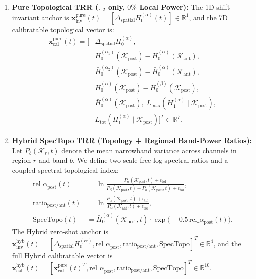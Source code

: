 \documentclass[10pt,twocolumn]{article}
\begin{document}
\begin{enumerate}
    \item \textbf{Pure Topological TRR ($\mathbb{F}_2$ only, $0\%$ Local Power):} The 1D shift-invariant anchor is $\mathbf{x}_{\mathrm{inv}}^{\mathrm{pure}}(t) = [\Delta_{\mathrm{spatial}} H_0^{(\alpha)}(t)] \in \mathbb{R}^1$, and the 7D calibratable topological vector is:
    \begin{equation}
    \begin{aligned}
        \mathbf{x}_{\mathrm{cal}}^{\mathrm{pure}}(t) = \Big[
        &\Delta_{\mathrm{spatial}} H_0^{(\alpha)},\\
        &\bar{H}_0^{(\alpha_1)}(\mathcal{K}_{\mathrm{post}}) - \bar{H}_0^{(\alpha)}(\mathcal{K}_{\mathrm{ant}}),\\
        &\bar{H}_0^{(\alpha_2)}(\mathcal{K}_{\mathrm{post}}) - \bar{H}_0^{(\alpha)}(\mathcal{K}_{\mathrm{ant}}),\\
        &\bar{H}_0^{(\alpha)}(\mathcal{K}_{\mathrm{post}}) - \bar{H}_0^{(\beta)}(\mathcal{K}_{\mathrm{post}}),\\
        &\bar{H}_0^{(\alpha)}(\mathcal{K}_{\mathrm{post}}),\;
        L_{\max}(H_1^{(\alpha)} \mid \mathcal{K}_{\mathrm{post}}),\\
        &L_{\mathrm{tot}}(H_1^{(\alpha)} \mid \mathcal{K}_{\mathrm{post}})
        \Big]^T \in \mathbb{R}^7.
    \end{aligned}
    \end{equation}
    \item \textbf{Hybrid SpecTopo TRR (Topology + Regional Band-Power Ratios):} Let $P_b(\mathcal{K}_r, t)$ denote the mean narrowband variance across channels in region $r$ and band $b$. We define two scale-free log-spectral ratios and a coupled spectral-topological index:
    \begin{align}
        \mathrm{rel\_\alpha}_{\mathrm{post}}(t) &= \ln\frac{P_\alpha(\mathcal{K}_{\mathrm{post}}, t) + \epsilon_{\mathrm{tol}}}{P_\beta(\mathcal{K}_{\mathrm{post}}, t) + P_\theta(\mathcal{K}_{\mathrm{post}}, t) + \epsilon_{\mathrm{tol}}}, \label{eq:rel_alpha}\\
        \mathrm{ratio}_{\mathrm{post/ant}}(t) &= \ln\frac{P_\alpha(\mathcal{K}_{\mathrm{post}}, t) + \epsilon_{\mathrm{tol}}}{P_\alpha(\mathcal{K}_{\mathrm{ant}}, t) + \epsilon_{\mathrm{tol}}}, \label{eq:ant_post}\\
        \mathrm{SpecTopo}(t) &= \bar{H}_0^{(\alpha)}(\mathcal{K}_{\mathrm{post}}, t)\cdot\exp\!\big(-0.5\,\mathrm{rel\_\alpha}_{\mathrm{post}}(t)\big). \label{eq:spectopo}
    \end{align}
    The Hybrid zero-shot anchor is $\mathbf{x}_{\mathrm{inv}}^{\mathrm{hyb}}(t) = [\Delta_{\mathrm{spatial}} H_0^{(\alpha)},\allowbreak \mathrm{rel\_\alpha}_{\mathrm{post}},\allowbreak \mathrm{ratio}_{\mathrm{post/ant}},\allowbreak \mathrm{SpecTopo}]^T \in \mathbb{R}^4$, and the full Hybrid calibratable vector is $\mathbf{x}_{\mathrm{cal}}^{\mathrm{hyb}}(t) = [\mathbf{x}_{\mathrm{cal}}^{\mathrm{pure}}(t)^T,\allowbreak \mathrm{rel\_\alpha}_{\mathrm{post}},\allowbreak \mathrm{ratio}_{\mathrm{post/ant}},\allowbreak \mathrm{SpecTopo}]^T \in \mathbb{R}^{10}$.
\end{enumerate}
\end{document}
